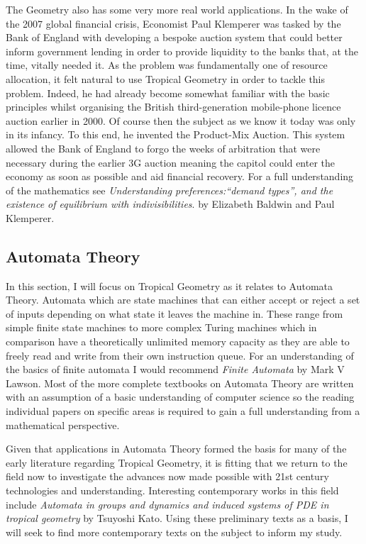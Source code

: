 \documentclass[12pt,a4paper]{amsart}
\theoremstyle{definition}
\theoremstyle{remark}
\begin{document}
The Geometry also has some very more real world applications.
In the wake of the 2007 global financial crisis, Economist Paul Klemperer was tasked by the Bank of England with developing a bespoke auction system that could better inform government lending in order to provide liquidity to the banks that, at the time, vitally needed it.
As the problem was fundamentally one of resource allocation, it felt natural to use Tropical Geometry in order to tackle this problem. Indeed, he had already become somewhat familiar with the basic principles whilst organising the British third-generation mobile-phone licence auction earlier in 2000\cite{binmore2002biggest}.
Of course then the subject as we know it today was only in its infancy.
To this end, he invented the Product-Mix Auction\cite{klemperer2010product}.
This system allowed the Bank of England to forgo the weeks of arbitration that were necessary during the earlier 3G auction meaning the capitol could enter the economy as soon as possible and aid financial recovery.
For a full understanding of the mathematics see \textit{Understanding preferences:“demand types”, and the existence of equilibrium with indivisibilities}.\cite{baldwin2019understanding} by Elizabeth Baldwin and Paul Klemperer.

\subsection{Automata Theory}
In this section, I will focus on Tropical Geometry as it relates to Automata Theory.
Automata which are state machines that can either accept or reject a set of inputs depending on what state it leaves the machine in.
These range from simple finite state machines to more complex Turing machines which in comparison have a theoretically unlimited memory capacity as they are able to freely read and write from their own instruction queue.
For an understanding of the basics of finite automata I would recommend \textit{Finite Automata}\cite{lawson2003finite} by Mark V Lawson. Most of the more complete textbooks on Automata Theory are written with an assumption of a basic understanding of computer science so the reading individual papers on specific areas is required to gain a full understanding from a mathematical perspective.

Given that applications in Automata Theory formed the basis for many of the early literature regarding Tropical Geometry\cite{simon1978limited}, it is fitting that we return to the field now to investigate the advances now made possible with 21st century technologies and understanding.
Interesting contemporary works in this field include \textit{Automata in groups and dynamics
and induced systems of PDE in
tropical geometry}\cite{kato2014automata} by Tsuyoshi Kato.
Using these preliminary texts as a basis, I will seek to find more contemporary texts on the subject to inform my study.
\end{document}
